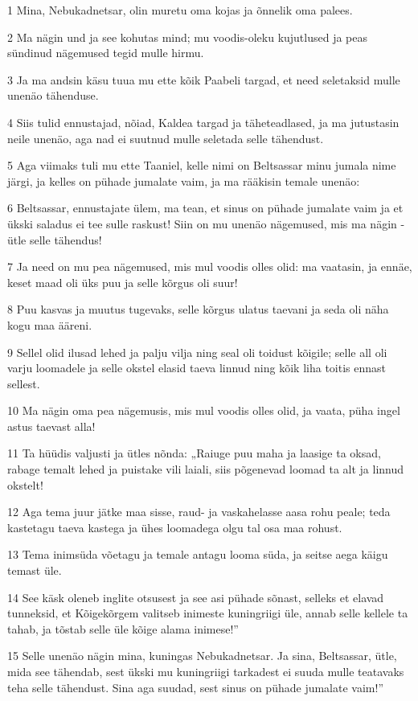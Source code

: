 \par 1 Mina, Nebukadnetsar, olin muretu oma kojas ja õnnelik oma palees.
\par 2 Ma nägin und ja see kohutas mind; mu voodis-oleku kujutlused ja peas sündinud nägemused tegid mulle hirmu.
\par 3 Ja ma andsin käsu tuua mu ette kõik Paabeli targad, et need seletaksid mulle unenäo tähenduse.
\par 4 Siis tulid ennustajad, nõiad, Kaldea targad ja täheteadlased, ja ma jutustasin neile unenäo, aga nad ei suutnud mulle seletada selle tähendust.
\par 5 Aga viimaks tuli mu ette Taaniel, kelle nimi on Beltsassar minu jumala nime järgi, ja kelles on pühade jumalate vaim, ja ma rääkisin temale unenäo:
\par 6 Beltsassar, ennustajate ülem, ma tean, et sinus on pühade jumalate vaim ja et ükski saladus ei tee sulle raskust! Siin on mu unenäo nägemused, mis ma nägin - ütle selle tähendus!
\par 7 Ja need on mu pea nägemused, mis mul voodis olles olid: ma vaatasin, ja ennäe, keset maad oli üks puu ja selle kõrgus oli suur!
\par 8 Puu kasvas ja muutus tugevaks, selle kõrgus ulatus taevani ja seda oli näha kogu maa ääreni.
\par 9 Sellel olid ilusad lehed ja palju vilja ning seal oli toidust kõigile; selle all oli varju loomadele ja selle okstel elasid taeva linnud ning kõik liha toitis ennast sellest.
\par 10 Ma nägin oma pea nägemusis, mis mul voodis olles olid, ja vaata, püha ingel astus taevast alla!
\par 11 Ta hüüdis valjusti ja ütles nõnda: „Raiuge puu maha ja laasige ta oksad, rabage temalt lehed ja puistake vili laiali, siis põgenevad loomad ta alt ja linnud okstelt!
\par 12 Aga tema juur jätke maa sisse, raud- ja vaskahelasse aasa rohu peale; teda kastetagu taeva kastega ja ühes loomadega olgu tal osa maa rohust.
\par 13 Tema inimsüda võetagu ja temale antagu looma süda, ja seitse aega käigu temast üle.
\par 14 See käsk oleneb inglite otsusest ja see asi pühade sõnast, selleks et elavad tunneksid, et Kõigekõrgem valitseb inimeste kuningriigi üle, annab selle kellele ta tahab, ja tõstab selle üle kõige alama inimese!”
\par 15 Selle unenäo nägin mina, kuningas Nebukadnetsar. Ja sina, Beltsassar, ütle, mida see tähendab, sest ükski mu kuningriigi tarkadest ei suuda mulle teatavaks teha selle tähendust. Sina aga suudad, sest sinus on pühade jumalate vaim!”

